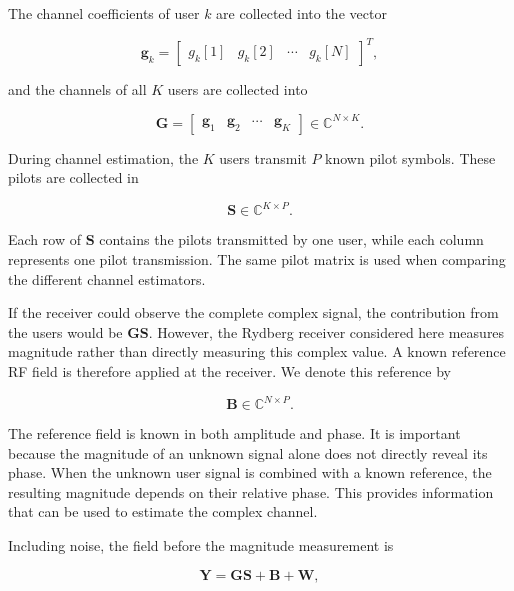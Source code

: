 \documentclass[journal]{IEEEtran}
\newcommand{\bG}{\mathbf{G}}
\newcommand{\bS}{\mathbf{S}}
\newcommand{\bB}{\mathbf{B}}
\newcommand{\bW}{\mathbf{W}}
\newcommand{\bY}{\mathbf{Y}}
\newcommand{\bg}{\mathbf{g}}
\begin{document}
The channel coefficients of user $k$ are collected into the vector

\begin{equation}
\bg_k
=
\begin{bmatrix}
g_k[1] &
g_k[2] &
\cdots &
g_k[N]
\end{bmatrix}^{T},
\end{equation}

and the channels of all $K$ users are collected into

\begin{equation}
\bG
=
\begin{bmatrix}
\bg_1 &
\bg_2 &
\cdots &
\bg_K
\end{bmatrix}
\in\mathbb{C}^{N\times K}.
\end{equation}

During channel estimation, the $K$ users transmit $P$ known pilot symbols.
These pilots are collected in

\begin{equation}
\bS
\in
\mathbb{C}^{K\times P}.
\end{equation}

Each row of $\bS$ contains the pilots transmitted by one user, while each
column represents one pilot transmission. The same pilot matrix is used
when comparing the different channel estimators.

If the receiver could observe the complete complex signal, the contribution
from the users would be $\bG\bS$. However, the Rydberg receiver considered
here measures magnitude rather than directly measuring this complex value.
A known reference RF field is therefore applied at the receiver. We denote
this reference by

\begin{equation}
\bB
\in
\mathbb{C}^{N\times P}.
\end{equation}

The reference field is known in both amplitude and phase. It is important
because the magnitude of an unknown signal alone does not directly reveal
its phase. When the unknown user signal is combined with a known reference,
the resulting magnitude depends on their relative phase. This provides
information that can be used to estimate the complex channel.

Including noise, the field before the magnitude measurement is

\begin{equation}
\bY
=
\bG\bS+\bB+\bW,
\end{equation}
\end{document}
